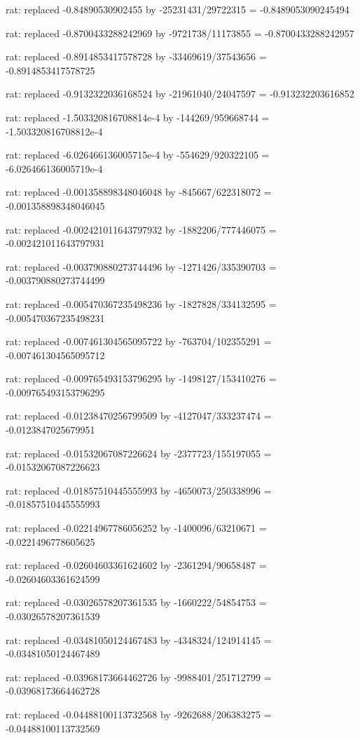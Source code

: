 \documentclass[a4paper,10pt]{article}
\begin{document}
\begin{eulernotebook}
\begin{eulercomment}
\begin{eulercomment}
\begin{eulercomment}
\begin{eulercomment}
\begin{eulercomment}
\begin{eulercomment}
\begin{eulercomment}
\begin{eulercomment}
\begin{eulercomment}
\begin{eulercomment}
\begin{eulercomment}
\begin{eulercomment}
\begin{eulercomment}
\begin{eulercomment}
\begin{eulercomment}
\begin{eulercomment}
\begin{euleroutput}
  rat: replaced -0.84890530902455 by -25231431/29722315 = -0.8489053090245494
  
  rat: replaced -0.8700433288242969 by -9721738/11173855 = -0.8700433288242957
  
  rat: replaced -0.8914853417578728 by -33469619/37543656 = -0.8914853417578725
  
  rat: replaced -0.9132322036168524 by -21961040/24047597 = -0.913232203616852
  
  rat: replaced -1.503320816708814e-4 by -144269/959668744 = -1.503320816708812e-4
  
  rat: replaced -6.026466136005715e-4 by -554629/920322105 = -6.026466136005719e-4
  
  rat: replaced -0.001358898348046048 by -845667/622318072 = -0.001358898348046045
  
  rat: replaced -0.002421011643797932 by -1882206/777446075 = -0.002421011643797931
  
  rat: replaced -0.003790880273744496 by -1271426/335390703 = -0.003790880273744499
  
  rat: replaced -0.005470367235498236 by -1827828/334132595 = -0.005470367235498231
  
  rat: replaced -0.007461304565095722 by -763704/102355291 = -0.007461304565095712
  
  rat: replaced -0.009765493153796295 by -1498127/153410276 = -0.009765493153796295
  
  rat: replaced -0.01238470256799509 by -4127047/333237474 = -0.0123847025679951
  
  rat: replaced -0.01532067087226624 by -2377723/155197055 = -0.01532067087226623
  
  rat: replaced -0.01857510445555993 by -4650073/250338996 = -0.01857510445555993
  
  rat: replaced -0.02214967786056252 by -1400096/63210671 = -0.0221496778605625
  
  rat: replaced -0.02604603361624602 by -2361294/90658487 = -0.02604603361624599
  
  rat: replaced -0.03026578207361535 by -1660222/54854753 = -0.03026578207361539
  
  rat: replaced -0.03481050124467483 by -4348324/124914145 = -0.03481050124467489
  
  rat: replaced -0.03968173664462726 by -9988401/251712799 = -0.03968173664462728
  
  rat: replaced -0.04488100113732568 by -9262688/206383275 = -0.04488100113732569
  

\end{euleroutput}
\end{eulercomment}
\end{eulercomment}
\end{eulercomment}
\end{eulercomment}
\end{eulercomment}
\end{eulercomment}
\end{eulercomment}
\end{eulercomment}
\end{eulercomment}
\end{eulercomment}
\end{eulercomment}
\end{eulercomment}
\end{eulercomment}
\end{eulercomment}
\end{eulercomment}
\end{eulercomment}
\end{eulernotebook}
\end{document}
